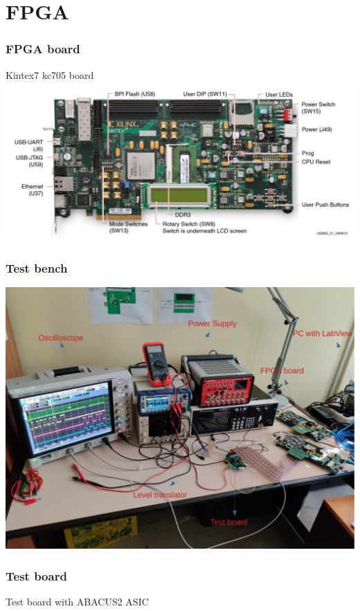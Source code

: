 \documentclass[aspectratio=169]{beamer}
\begin{document}
	\section{FPGA}
	
	\begin{frame}
	\frametitle{FPGA board }
	\begin{center}
		Kintex7 kc705 board
		\includegraphics[width=0.85 \textwidth]{IMG/Kintex7_board.PNG}
	\end{center}
	\end{frame}

	\begin{frame}
	\frametitle{Test bench}
	\begin{center}
		\includegraphics[width=0.65 \textwidth]{IMG/TestBench.pdf}
	\end{center}
	\end{frame}

	\begin{frame}
	\frametitle{Test board}
	\begin{center}
		Test board with ABACUS2 ASIC
	\end{center}
	\end{frame}
\end{document}
